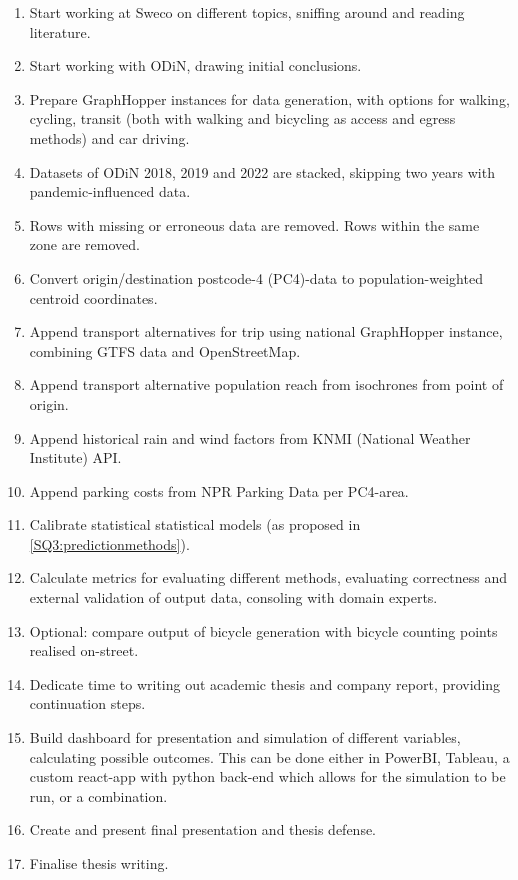 \documentclass[sigconf, natbib=false, nonacm]{acmart}
\begin{document}
    \begin{enumerate}
        \item Start working at Sweco on different topics, sniffing around and reading literature.
        \item Start working with ODiN, drawing initial conclusions.
        \item Prepare GraphHopper instances for data generation, with options for walking, cycling, transit (both with walking and bicycling as access and egress methods) and car driving. 
        \item Datasets of ODiN 2018, 2019 and 2022 are stacked, skipping two years with pandemic-influenced data. 
        \item Rows with missing or erroneous data are removed. Rows within the same zone are removed.
        \item Convert origin/destination postcode-4 (PC4)-data to population-weighted centroid coordinates.
        \item Append transport alternatives for trip using national GraphHopper instance, combining GTFS data and OpenStreetMap.
        \item Append transport alternative population reach from isochrones from point of origin.
        \item Append historical rain and wind factors from KNMI (National Weather Institute) API.
        \item Append parking costs from NPR Parking Data per PC4-area.
        \item Calibrate statistical statistical models (as proposed in \ref{SQ3:predictionmethods}).
        \item Calculate metrics for evaluating different methods, evaluating correctness and external validation of output data, consoling with domain experts. 
        \item Optional: compare output of bicycle generation with bicycle counting points realised on-street. 
        \item Dedicate time to writing out academic thesis and company report, providing continuation steps. 
        \item Build dashboard for presentation and simulation of different variables, calculating possible outcomes. This can be done either in PowerBI, Tableau, a custom react-app with python back-end which allows for the simulation to be run, or a combination. 
        \item Create and present final presentation and thesis defense. 
        \item Finalise thesis writing.
    \end{enumerate}
\end{document}
